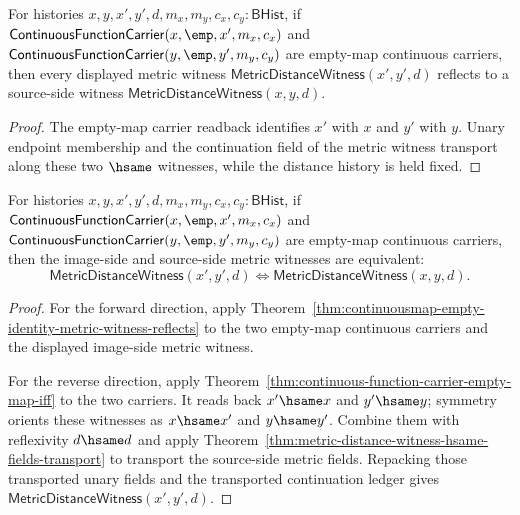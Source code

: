 \begin{theorem}
\label{thm:continuousmap-empty-identity-metric-witness-reflects}
For histories $x,y,x',y',d,m_x,m_y,c_x,c_y:\mathsf{BHist}$, if
$\mathsf{ContinuousFunctionCarrier}(x,\emp,x',m_x,c_x)$ and
$\mathsf{ContinuousFunctionCarrier}(y,\emp,y',m_y,c_y)$ are empty-map
continuous carriers, then every displayed metric witness
$\mathsf{MetricDistanceWitness}(x',y',d)$ reflects to a source-side witness
$\mathsf{MetricDistanceWitness}(x,y,d)$.
\end{theorem}
\begin{proof}
The empty-map carrier readback identifies $x'$ with $x$ and $y'$ with $y$.
Unary endpoint membership and the continuation field of the metric witness
transport along these two $\hsame$ witnesses, while the distance history is
held fixed.
\end{proof}

\begin{theorem}
\label{thm:continuousmap-empty-identity-metric-witness-iff}
For histories $x,y,x',y',d,m_x,m_y,c_x,c_y:\mathsf{BHist}$, if
$\mathsf{ContinuousFunctionCarrier}(x,\emp,x',m_x,c_x)$ and
$\mathsf{ContinuousFunctionCarrier}(y,\emp,y',m_y,c_y)$ are empty-map
continuous carriers, then the image-side and source-side metric witnesses are
equivalent:
$$
\mathsf{MetricDistanceWitness}(x',y',d)\Longleftrightarrow
\mathsf{MetricDistanceWitness}(x,y,d).
$$
\end{theorem}
\begin{proof}
For the forward direction, apply
Theorem~\ref{thm:continuousmap-empty-identity-metric-witness-reflects} to the
two empty-map continuous carriers and the displayed image-side metric witness.

For the reverse direction, apply
Theorem~\ref{thm:continuous-function-carrier-empty-map-iff} to the two
carriers. It reads back $x'\hsame x$ and $y'\hsame y$; symmetry orients these
witnesses as $x\hsame x'$ and $y\hsame y'$. Combine them with reflexivity
$d\hsame d$ and apply
Theorem~\ref{thm:metric-distance-witness-hsame-fields-transport} to transport
the source-side metric fields. Repacking those transported unary fields and
the transported continuation ledger gives
$\mathsf{MetricDistanceWitness}(x',y',d)$.
\end{proof}

